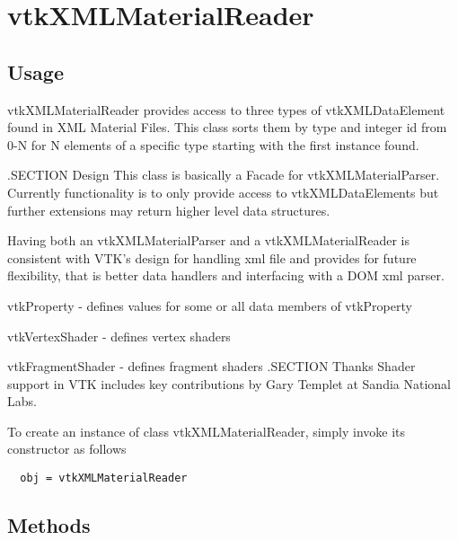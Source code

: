 \section{vtkXMLMaterialReader}

\subsection{Usage}

 vtkXMLMaterialReader provides access to three types of vtkXMLDataElement
 found in XML Material Files. This class sorts them by type and integer
 id from 0-N for N elements of a specific type starting with the first
 instance found.

 .SECTION Design
 This class is basically a Facade for vtkXMLMaterialParser. Currently
 functionality is to only provide access to vtkXMLDataElements but further
 extensions may return higher level data structures.

 Having both an vtkXMLMaterialParser and a vtkXMLMaterialReader is consistent with
 VTK's design for handling xml file and provides for future flexibility, that is
 better data handlers and interfacing with a DOM xml parser.

 vtkProperty - defines values for some or all data members of vtkProperty

 vtkVertexShader - defines vertex shaders

 vtkFragmentShader - defines fragment shaders
 .SECTION Thanks
 Shader support in VTK includes key contributions by Gary Templet at 
 Sandia National Labs.

To create an instance of class vtkXMLMaterialReader, simply
invoke its constructor as follows
\begin{verbatim}
  obj = vtkXMLMaterialReader
\end{verbatim}
\subsection{Methods}

